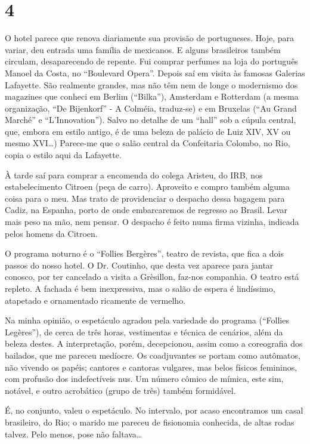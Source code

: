 \section*{4 \adfflatleafright {}}
O hotel parece que renova diariamente sua provisão de portugueses. Hoje, para variar, deu entrada uma família de mexicanos. E alguns brasileiros também circulam, desaparecendo de repente. Fui comprar perfumes na loja do português Manoel da Costa, no “Boulevard Opera”. Depois saí em visita às famosas Galerias Lafayette. São realmente grandes, mas não têm nem de longe o modernismo dos magazines que conheci em Berlim (“Bilka”), Amsterdam e Rotterdam (a mesma organização, “De Bijenkorf” - A Colméia, traduz-se) e em Bruxelas (“Au Grand Marché” e “L’Innovation”). Salvo no detalhe de um “hall” sob a cúpula central, que, embora em estilo antigo, é de uma beleza de palácio de Luiz XIV, XV ou mesmo XVI\ldots) Parece-me que o salão central da Confeitaria Colombo, no Rio, copia o estilo aqui da Lafayette.

À tarde saí para comprar a encomenda do colega Aristeu, do IRB, nos estabelecimento Citroen (peça de carro). Aproveito e compro também alguma coisa para o meu. Mas trato de providenciar o despacho dessa bagagem para Cadiz, na Espanha, porto de onde embarcaremos de regresso ao Brasil. Levar mais peso na mão, nem pensar. O despacho é feito numa firma vizinha, indicada pelos homens da Citroen.

O programa noturno é o “Follies Bergères”, teatro de revista, que fica a dois passos do nosso hotel. O Dr. Coutinho, que desta vez aparece para jantar conosco, por ter cancelado a visita a Grèsillon, faz-nos companhia. O teatro está repleto. A fachada é bem inexpressiva, mas o salão de espera é lindíssimo, atapetado e ornamentado ricamente de vermelho.

Na minha opinião, o espetáculo agradou pela variedade do programa (“Follies Legères”), de cerca de três horas, vestimentas e técnica de cenários, além da beleza destes. A interpretação, porém, decepcionou, assim como a coreografia dos bailados, que me pareceu medíocre. Os coadjuvantes se portam como autômatos, não vivendo os papéis; cantores e cantoras vulgares, mas belos físicos femininos, com profusão dos indefectíveis nus. Um número cômico de mímica, este sim, notável, e outro acrobático (grupo de três) também formidável.

É, no conjunto, valeu o espetáculo. No intervalo, por acaso encontramos um casal brasileiro, do Rio; o marido me pareceu de fisionomia conhecida, de altas rodas talvez. Pelo menos, pose não faltava\ldots

